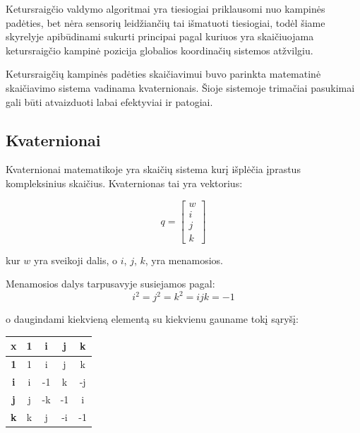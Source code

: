 \documentclass[12pt, a4paper, lithuanian, final]{article}
\begin{document}
Ketursraigčio valdymo algoritmai yra tiesiogiai priklausomi nuo kampinės padėties, bet nėra sensorių leidžiančių tai išmatuoti tiesiogiai, todėl šiame skyrelyje apibūdinami sukurti principai pagal kuriuos yra skaičiuojama ketursraigčio kampinė pozicija globalios koordinačių sistemos atžvilgiu.

Ketursraigčių kampinės padėties skaičiavimui buvo parinkta matematinė skaičiavimo sistema vadinama kvaternionais.
Šioje sistemoje trimačiai pasukimai gali būti atvaizduoti labai efektyviai ir patogiai.

\subsection{Kvaternionai}
\label{subskyr-quaternion}

Kvaternionai matematikoje yra skaičių sistema kurį išplėčia įprastus kompleksinius skaičius.
Kvaternionas tai yra vektorius:

\begin{equation}
	q = \left[
		\begin{array}{c}
			w \\
			i \\
			j \\
			k
		\end{array}
	\right]
\end{equation}

kur $w$ yra sveikoji dalis, o $i$, $j$, $k$, yra menamosios.


Menamosios dalys tarpusavyje susiejamos pagal:
\begin{equation}
	i^2 = j^2 = k^2 = ijk = -1
\end{equation}

o daugindami kiekvieną elementą su kiekvienu gauname tokį sąryšį:

\begin{center}
\begin{tabular}{ | c | c | c | c | c | }
	\hline
	\textbf{x} & \textbf{1} & \textbf{i} & \textbf{j} & \textbf{k} \\
	\hline
	\textbf{1} & 1 & i & j & k \\
	\hline
	\textbf{i} & i & -1 & k & -j \\
	\hline
	\textbf{j} & j & -k & -1 & i \\
	\hline
	\textbf{k} & k & j & -i & -1 \\
	\hline
\end{tabular}
\end{center}
\end{document}
